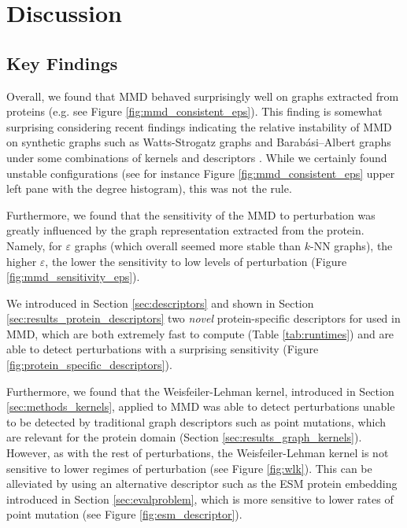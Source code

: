 \chapter{Discussion}


\section{Key Findings}

Overall, we found that MMD behaved surprisingly well on graphs extracted from
proteins (e.g. see Figure \ref{fig:mmd_consistent_eps}). This finding is
somewhat surprising considering recent findings indicating the relative
instability of MMD on synthetic graphs such as Watts-Strogatz graphs and
Barabási–Albert graphs under some combinations of kernels and descriptors
\citep{o2021evaluation}. While we certainly found unstable configurations
(see for instance Figure \ref{fig:mmd_consistent_eps} upper left pane with the degree histogram),
this was not the rule.

Furthermore, we found that the sensitivity of the MMD to perturbation was
greatly influenced by the graph representation extracted from the protein.
Namely, for $\varepsilon$ graphs (which overall seemed more stable than $k$-NN
graphs), the higher $\varepsilon$, the lower the sensitivity to low levels of
perturbation (Figure \ref{fig:mmd_sensitivity_eps}).

We introduced in Section \ref{sec:descriptors} and shown in Section
\ref{sec:results_protein_descriptors} two \emph{novel} protein-specific descriptors for
used in MMD, which are both extremely fast to compute (Table \ref{tab:runtimes})
and are able to detect perturbations with a surprising sensitivity (Figure
\ref{fig:protein_specific_descriptors}).

Furthermore, we found that the Weisfeiler-Lehman kernel, introduced in Section
\ref{sec:methods_kernels}, applied to MMD was able to detect perturbations
unable to be detected by traditional graph descriptors such as point mutations,
which are relevant for the protein domain (Section
\ref{sec:results_graph_kernels}). However, as with the rest of perturbations,
the Weisfeiler-Lehman kernel is not sensitive to lower regimes of perturbation
(see Figure \ref{fig:wlk}).
This can be alleviated by using an alternative descriptor such as the ESM
protein embedding introduced in Section \ref{sec:evalproblem}, which is more
sensitive to lower rates of point mutation (see Figure
\ref{fig:esm_descriptor}).

